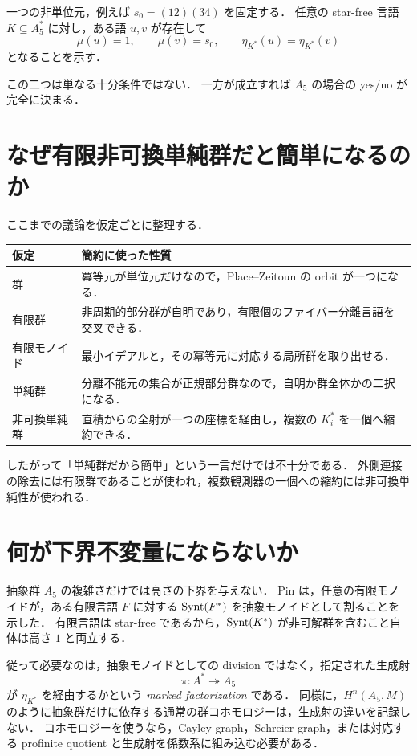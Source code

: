 一つの非単位元，例えば $s_0=(12)(34)$ を固定する．
任意の star-free 言語 $K\subseteq A_5^*$ に対し，ある語 $u,v$ が存在して
\[
\mu(u)=1,
\qquad
\mu(v)=s_0,
\qquad
\eta_{K^*}(u)=\eta_{K^*}(v)
\]
となることを示す．

この二つは単なる十分条件ではない．
一方が成立すれば $A_5$ の場合の yes/no が完全に決まる．

\section{なぜ有限非可換単純群だと簡単になるのか}

ここまでの議論を仮定ごとに整理する．

\begin{center}
\begin{tabular}{p{}p{}}
\toprule
仮定 & 簡約に使った性質 \\
\midrule
群 & 冪等元が単位元だけなので，Place--Zeitoun の orbit が一つになる． \\
有限群 & 非周期的部分群が自明であり，有限個のファイバー分離言語を交叉できる． \\
有限モノイド & 最小イデアルと，その冪等元に対応する局所群を取り出せる． \\
単純群 & 分離不能元の集合が正規部分群なので，自明か群全体かの二択になる． \\
非可換単純群 & 直積からの全射が一つの座標を経由し，複数の $K_i^*$ を一個へ縮約できる． \\
\bottomrule
\end{tabular}
\end{center}

したがって「単純群だから簡単」という一言だけでは不十分である．
外側連接の除去には有限群であることが使われ，複数観測器の一個への縮約には非可換単純性が使われる．

\section{何が下界不変量にならないか}

抽象群 $A_5$ の複雑さだけでは高さの下界を与えない．
Pin は，任意の有限モノイドが，ある有限言語 $F$ に対する $\operatorname{Synt}(F^*)$ を抽象モノイドとして割ることを示した\cite{Pin1978}．
有限言語は star-free であるから，$\operatorname{Synt}(K^*)$ が非可解群を含むこと自体は高さ $1$ と両立する．

従って必要なのは，抽象モノイドとしての division ではなく，指定された生成射
\[
\pi:A^*\twoheadrightarrow A_5
\]
が $\eta_{K^*}$ を経由するかという \emph{marked factorization} である．
同様に，$H^n(A_5,M)$ のように抽象群だけに依存する通常の群コホモロジーは，生成射の違いを記録しない．
コホモロジーを使うなら，Cayley graph，Schreier graph，または対応する profinite quotient と生成射を係数系に組み込む必要がある．

